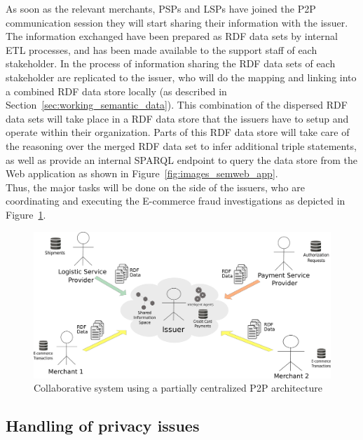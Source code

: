 As soon as the relevant merchants, \gls{PSP}s and \gls{LSP}s have joined the \gls{P2P} communication session they will start sharing their information with the issuer. The information exchanged have been prepared as \gls{RDF} data sets by internal \gls{ETL} processes, and has been made available to the support staff of each stakeholder. In the process of information sharing the \gls{RDF} data sets of each stakeholder are replicated to the issuer, who will do the mapping and linking into a combined \gls{RDF} data store locally (as described in Section~\ref{sec:working_semantic_data}). This combination of the dispersed \gls{RDF} data sets will take place in a \gls{RDF} data store that the issuers have to setup and operate within their organization. Parts of this \gls{RDF} data store will take care of the reasoning over the merged \gls{RDF} data set to infer additional triple statements, as well as provide an internal \gls{SPARQL} endpoint to query the data store from the Web application as shown in Figure~\ref{fig:images_semweb_app}. \\

Thus, the major tasks will be done on the side of the issuers, who are coordinating and executing the \gls{E-commerce} fraud investigations as depicted in Figure~\ref{fig:images_p2p_centralized}.\@

\begin{figure}[H]
	\centering
		\includegraphics[width=0.9\columnwidth]{images/system_P2P_centralized.pdf}
	\caption{Collaborative system using a partially centralized \gls{P2P} architecture}
\label{fig:images_p2p_centralized}
\end{figure}


\subsection{Handling of privacy issues}
\label{subsec:p2p_partially_issuer_privacy}

